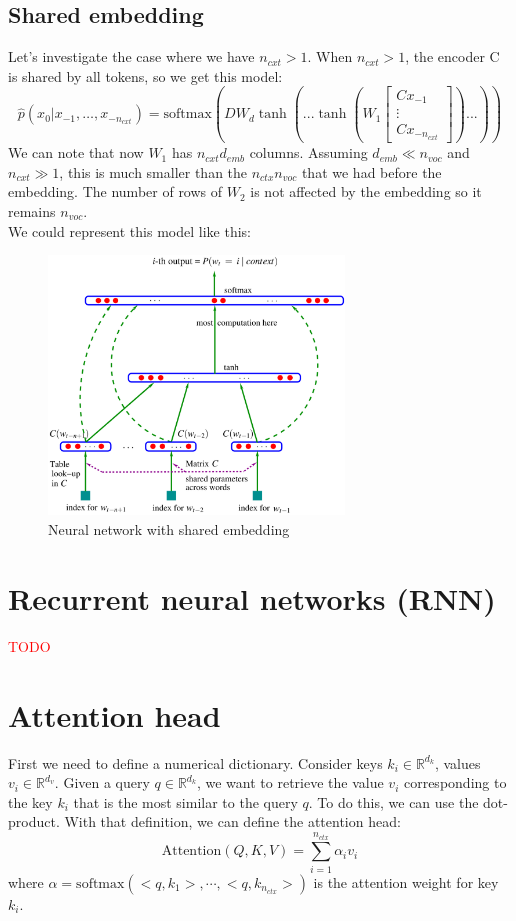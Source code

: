 \documentclass[12pt, openany]{report}
\newcommand{\R}{\mathbb{R}}
\theoremstyle{definition}
\begin{document}
\subsection{Shared embedding}
Let's investigate the case where we have $n_{cxt} > 1$. When $n_{cxt} > 1$, the encoder C is shared by all tokens, so we get this model:
\begin{equation}
  \hat{p}(x_0 | x_{-1}, \ldots, x_{-n_{cxt}}) = \text{softmax}(D W_d \tanh(... \tanh(W_1 \begin{bmatrix} C x_{-1} \\ \vdots \\ C x_{-n_{cxt}} \end{bmatrix}) ... ))
\end{equation}
We can note that now $W_1$ has $n_{cxt}d_{emb}$ columns. Assuming $d_{emb} \ll n_{voc}$ and $n_{cxt} \gg 1$, this is much smaller than the $n_{ctx}n_{voc}$ that we had before the embedding. The number of rows of $W_2$ is not affected by the embedding so it remains $n_{voc}$.\\
We could represent this model like this:\\
\begin{figure}[H]
    \centering
    \includegraphics[width=0.7\textwidth]{img/shared_embedding.png}
    \caption{Neural network with shared embedding}
    \label{fig:shared_embedding}
\end{figure}
\section{Recurrent neural networks (RNN)}
\textcolor{red}{TODO}
\section{Attention head}
First we need to define a numerical dictionary. Consider keys $k_i \in \R^{d_k}$, values $v_i \in \R^{d_v}$. Given a query $q \in \R^{d_k}$, we want to retrieve the value $v_i$ corresponding to the key $k_i$ that is the most similar to the query $q$. To do this, we can use the dot-product. With that definition, we can define the attention head:
\begin{equation}
  \text{Attention}(Q,K,V) = \sum_{i=1}^{n_{ctx}} \alpha_i v_i
\end{equation}
where $\alpha = \text{softmax}(<q,k_1>, \cdots, <q,k_{n_{ctx}}>)$ is the attention weight for key $k_i$.
\end{document}

